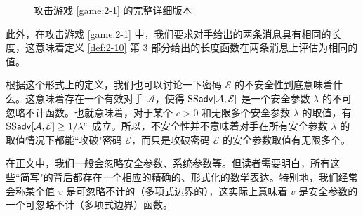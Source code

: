 \begin{figure}
	\centering
	
	\caption{攻击游戏 \ref{game:2-1} 的完整详细版本}
	\label{fig:2-6}
\end{figure}

此外，在攻击游戏 \ref{game:2-1} 中，我们要求对手给出的两条消息具有相同的长度，这意味着定义 \ref{def:2-10} 第 3 部分给出的长度函数在两条消息上评估为相同的值。

根据这个形式上的定义，我们也可以讨论一下密码 $\mathcal{E}$ 的不安全性到底意味着什么。这意味着存在一个有效对手 $\mathcal{A}$，使得 ${\rm SS\mathsf{adv}}[\mathcal{A},\mathcal{E}]$ 是一个安全参数 $\lambda$ 的不可忽略不计函数。也就意味着，对于某个 $c>0$ 和无限多个安全参数 $\lambda$ 的取值，有 ${\rm SS\mathsf{adv}}[\mathcal{A},\mathcal{E}]\geq{1}/{\lambda^c}$ 成立。所以，不安全性并不意味着对手在所有安全参数 $\lambda$ 的取值情况下都能``攻破"密码 $\mathcal{E}$，而只是攻破密码 $\mathcal{E}$ 的安全参数取值有无限多个。

在正文中，我们一般会忽略安全参数、系统参数等。但读者需要明白，所有这些``简写"的背后都存在一个相应的精确的、形式化的数学表达。特别地，我们经常会称某个值 $v$ 是可忽略不计的（多项式边界的），这实际上意味着 $v$ 是安全参数的一个可忽略不计（多项式边界）函数。